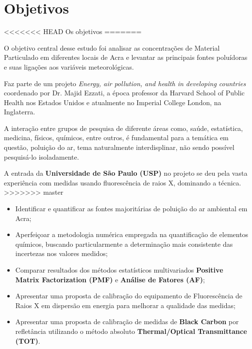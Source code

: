 \section{Objetivos}
<<<<<<< HEAD
%
%
Os objetivos 
=======

O objetivo central desse estudo foi analisar as concentrações de Material 
Particulado em diferentes locais de Acra e levantar as principais fontes 
poluídoras e suas ligações aos variáveis meteorológicas. 

Faz parte de um projeto \textit{Energy, air pollution, and health 
in developing countries} coordenado por Dr. Majid Ezzati, 
a época professor da Harvard School of Public Health nos 
Estados Unidos e atualmente no Imperial College London, 
na Inglaterra.  

A interação entre grupos de pesquisa de diferente áreas como, saúde, 
estatística, medicina, físicos, químicos, entre outros, é fundamental
para a temática em questão, poluição do ar, tema naturalmente  
interdisplinar, não sendo possível pesquisá-lo isoladamente. 

A entrada da \textbf{Universidade de São Paulo (USP)} no projeto se deu pela
vasta experiência com medidas usando fluorescência de raios X, dominando a técnica.
>>>>>>> master

\begin{itemize}
  \item Identificar e quantificar as fontes majoritárias de poluição do ar ambiental em Acra;
  \item Aperfeiçoar a metodologia numérica empregada na quantificação de elementos químicos, 
        buscando particularmente a determinação mais consistente das incertezas nos valores medidos;
  \item Comparar resultados dos métodos estatísticos multivariados
        \textbf{Positive Matrix Factorization (PMF)} e \textbf{Análise de Fatores (AF)};
  \item Apresentar uma proposta de calibração do equipamento de Fluorescência de Raios X
        em dispersão em energia para melhorar a qualidade das medidas;
  \item Apresentar uma proposta de calibração de medidas de \textbf{Black Carbon} por refletância
        utilizando o método absoluto \textbf{Thermal/Optical Transmittance (TOT)}.
\end{itemize}




